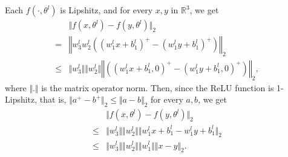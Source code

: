 \documentclass[10pt,journal,compsoc]{IEEEtran}
\newcommand{\real}{\ensuremath{\mathbb{R}}}
\begin{document}
\maketitle

\IEEEdisplaynontitleabstractindextext



%
\IEEEpeerreviewmaketitle









\label{appendix:A1}

Each $f(\cdot,\theta^l)$ is Lipshitz, and for every $x,y$ in $\real^3$, we get
\begin{equation}
\begin{split}
&\Vert f(x,\theta^l) -f(y,\theta^l)\Vert_2\\
=&\left\Vert w_3^lw_2^l((w_1^l x+b_1^l)^+-(w_1^l y+b_1^l)^+)\right\Vert_2\\
\leq&\Vert w_3^l\Vert \Vert w_2^l\Vert\left\Vert((w_1^l x+b_1^l,0)^+-(w_1^l y+b_1^l,0)^+)\right\Vert_2,
\end{split}
\end{equation}
where $\Vert .\Vert $ is the matrix operator norm. Then, since the ReLU function is 1-Lipshitz, that is, $\Vert a^+-b^+ \Vert_2 \leq \Vert a-b \Vert_2$ for every $a,b$, we get
\begin{equation} \label{Eq:lipshitz}
\begin{split}
&\Vert f(x,\theta^l) -f(y,\theta^l)\Vert_2\\
\leq&\Vert w_3^l\Vert \Vert w_2^l\Vert \Vert w_1^l x+b_1^l- w_1^l y+b_1^l \Vert_2\\
\leq&\Vert w_3^l\Vert \Vert w_2^l\Vert \Vert w_1^l\Vert \Vert x- y \Vert_2.
\end{split}
\end{equation}
\end{document}
